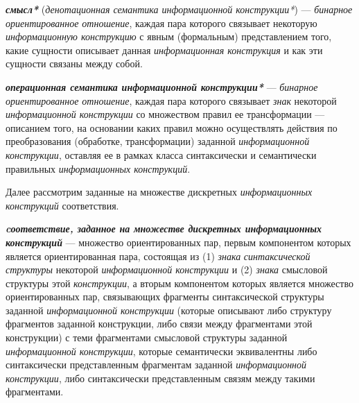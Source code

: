 \textbf{\textit{смысл*}} (\textit{денотационная семантика информационной конструкции*}) --- \textit{бинарное ориентированное отношение}, каждая пара которого связывает некоторую \textit{информационную конструкцию} с явным (формальным) представлением того, какие сущности описывает данная \textit{информационная конструкция} и как эти сущности связаны между собой.

\textbf{\textit{операционная семантика информационной конструкции*}} --- \textit{бинарное ориентированное отношение}, каждая пара которого связывает \textit{знак} некоторой \textit{информационной конструкции} со множеством правил ее трансформации --- описанием того, на основании каких правил можно осуществлять действия по преобразования (обработке, трансформации) заданной \textit{информационной конструкции}, оставляя ее в рамках класса синтаксически и семантически правильных \textit{информационных конструкций}.

\begin{SCn}


\end{SCn}

Далее рассмотрим заданные на множестве дискретных \textit{информационных конструкций} соответствия.

\begin{SCn}

    \begin{scnindent}
    \end{scnindent}

\end{SCn}

\textbf{\textit{cоответствие, заданное на множестве дискретных информационных конструкций}} --- множество ориентированных пар, первым компонентом которых является ориентированная пара, состоящая из (1) \textit{знака} \textit{синтаксической структуры} некоторой \textit{информационной конструкции} и (2) \textit{знака} смысловой структуры этой \textit{конструкции}, а вторым компонентом которых является множество ориентированных пар, связывающих фрагменты синтаксической структуры заданной \textit{информационной конструкции} (которые описывают либо структуру фрагментов заданной конструкции, либо связи между фрагментами этой конструкции) с теми фрагментами смысловой структуры заданной \textit{информационной конструкции}, которые семантически эквивалентны либо синтаксически представленным фрагментам заданной \textit{информационной конструкции}, либо синтаксически представленным связям между такими фрагментами.

